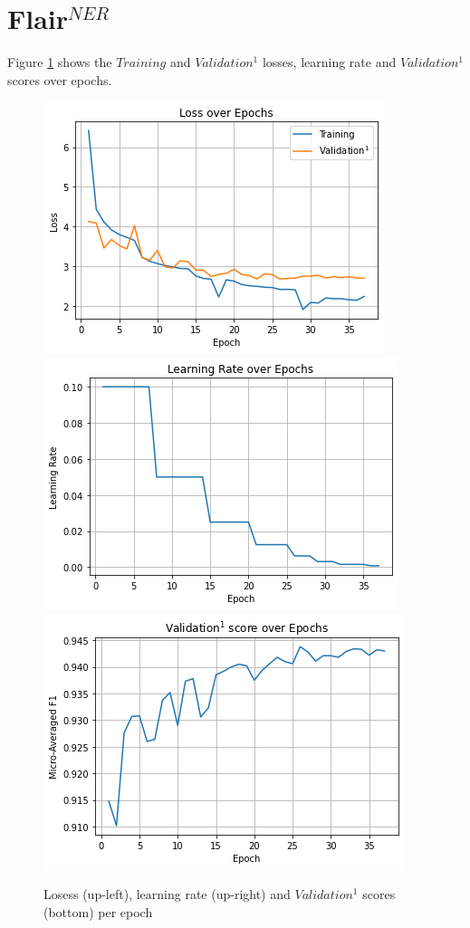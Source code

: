 \documentclass{report}
\theoremstyle{definition}
\theoremstyle{remark}
\begin{document}
\section{Flair$^{NER}$}
\label{sec:app:flairner}
Figure \ref{fig:flairtrain} shows the $Training$ and $Validation^1$ losses, learning rate and $Validation^1$ scores over epochs. 
\begin{figure}[H]
    \centering
    \includegraphics[scale=0.45]{flair_loss.png}
    \includegraphics[scale=0.45]{flair_lrs.png}
    \includegraphics[scale=0.45]{flair_scores.png}
    \caption{Losess (up-left), learning rate (up-right) and $Validation^1$ scores (bottom) per epoch}
    \label{fig:flairtrain}
\end{figure}
\newpage
\end{document}
